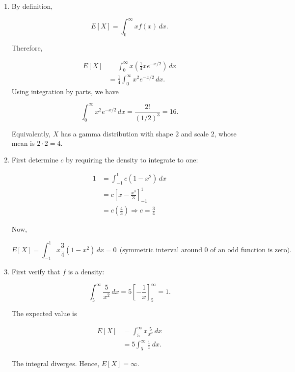 \documentclass[11pt]{article}
\newenvironment{solution}{
    \par
    \begin{tcolorbox}[
        colback=white,
        colframe=uwgold,
        boxrule=0.7pt,
        arc=2mm,
        left=3mm,
        right=3mm,
        top=2mm,
        bottom=2mm,
        breakable,
        before skip=0.5em,
        after skip=1em,
        title=\textbf{Solution},
        coltitle=uwpurple,
        fonttitle=\bfseries
    ]
}{
    \end{tcolorbox}
}
\begin{document}
\begin{solution}

\begin{enumerate}[label=(\alph*)]

\item By definition,

\[
E[X]
=
\int_{0}^{\infty}x f(x)\,dx.
\]

Therefore,

\begin{align*}
E[X]
&=
\int_{0}^{\infty}
x\left(\frac14xe^{-x/2}\right)\,dx\\
&=
\frac14
\int_{0}^{\infty}x^2e^{-x/2}\,dx.
\end{align*}
Using integration by parts, we have

\[
\int_{0}^{\infty}x^2e^{-x/2}\,dx
=
\frac{2!}{(1/2)^3}
=
16.
\]

Equivalently, \(X\) has a gamma distribution with shape \(2\) and scale
\(2\), whose mean is \(2\cdot2=4\).

\item First determine \(c\) by requiring the density to integrate to one:

\begin{align*}
1
&=
\int_{-1}^{1}c(1-x^2)\,dx\\
&=
c\left[x-\frac{x^3}{3}\right]_{-1}^{1}\\
&=
c\left(\frac43\right)\Rightarrow c=\frac{3}{4}
\end{align*}


Now,

\[
E[X]
=
\int_{-1}^{1}x\frac34(1-x^2)\,dx = 0 \ \ \text{(symmetric interval around 0 of an odd function is zero)}.
\]


\item First verify that \(f\) is a density:

\[
\int_{5}^{\infty}\frac{5}{x^2}\,dx
=
5\left[-\frac1x\right]_{5}^{\infty}
=
1.
\]

The expected value is

\begin{align*}
E[X]
&=
\int_{5}^{\infty}x\frac{5}{x^2}\,dx\\
&=
5\int_{5}^{\infty}\frac1x\,dx.
\end{align*}

The integral diverges. Hence, $ {E[X]=\infty}.$



\end{enumerate}

\end{solution}
 
\end{document}
